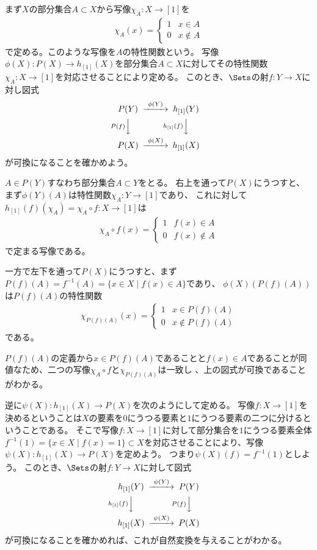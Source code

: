 \documentclass{jsarticle}
\begin{document}
\vspace{5pt}

まず$X$の部分集合$A \subset X$から写像$\chi_A:X \to [1]$を
\begin{align*}
\chi_A(x)=\begin{cases} 1 & x \in A\\ 0 & x \notin A\end{cases}
\end{align*}
で定める。このような写像を$A$の特性関数という。
写像$\phi(X):P(X) \to h_{[1]}(X)$を部分集合$A \subset X$に対してその特性関数$\chi_A:X \to [1]$を対応させることにより定める。
このとき、$\Sets$の射$f:Y \to X$に対し図式
\begin{align*}
\begin{CD}
P(Y)@>\phi(Y)>>h_{[1]}(Y)\\
@VP(f)VV@Vh_{[1]}(f)VV\\
P(X)@>\phi(X)>>h_{[1]}(X)
\end{CD}
\end{align*}
が可換になることを確かめよう。

$A \in P(Y)$すなわち部分集合$A\subset Y$をとる。
右上を通って$P(X)$にうつすと、まず$\phi(Y)(A)$は特性関数$\chi_A:Y \to [1]$であり、
これに対して$h_{[1]}(f)(\chi_A)=\chi_A\circ f:X \to [1]$は
\begin{align*}
\chi_A\circ f(x)=\begin{cases} 1 & f(x) \in A\\ 0 & f(x) \notin A\end{cases}
\end{align*}
で定まる写像である。

一方で左下を通って$P(X)$にうつすと、まず$P(f)(A)=f^{-1}(A)=\{x\in X\mid f(x) \in A\}$であり、
$\phi(X)(P(f)(A))$は$P(f)(A)$の特性関数
\begin{align*}
\chi_{P(f)(A)}(x)=\begin{cases} 1 & x \in P(f)(A)\\ 0 & x \notin P(f)(A)\end{cases}
\end{align*}
である。

$P(f)(A)$の定義から$x\in P(f)(A)$であることと$f(x) \in A$であることが同値なため、二つの写像$\chi_A \circ f$と$\chi_{P(f)(A)}$は一致し
、上の図式が可換であることがわかる。
\vspace{5pt}

逆に$\psi(X):h_{[1]}(X) \to P(X)$を次のようにして定める。
写像$f:X \to [1]$を決めるということは$X$の要素を$0$にうつる要素と$1$にうつる要素の二つに分けるということである。
そこで写像$f:X \to [1]$に対して部分集合を$1$にうつる要素全体$f^{-1}(1)=\{x \in X \mid f(x)=1\} \subset X$を対応させることにより、写像$\psi(X):h_{[1]}(X) \to P(X)$を定めよう。
つまり$\psi(X)(f)=f^{-1}(1)$としよう。
このとき、$\Sets$の射$f:Y \to X$に対して図式
\begin{align*}
\begin{CD}
h_{[1]}(Y)@>\psi(Y)>>P(Y)\\
@Vh_{[1]}(f)VV@VP(f)VV\\
h_{[1]}(X)@>\psi(X)>>P(X)
\end{CD}
\end{align*}
が可換になることを確かめれば、これが自然変換を与えることがわかる。
\end{document}
